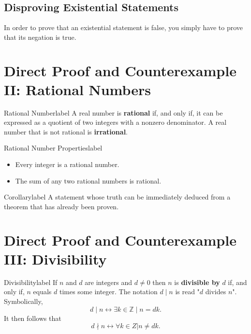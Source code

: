 \documentclass[a4paper]{report}
\begin{document}
\subsection{Disproving Existential Statements}

In order to prove that an existential statement is false, you simply have to prove that its negation
is true.

\section{Direct Proof and Counterexample II: Rational Numbers}

\begin{definition}{Rational Number}{label}
    A real number is \textbf{rational} if, and only if, it can be expressed as a quotient of
    two integers with a nonzero denominator. A real number that is not rational is \textbf{irrational}.
\end{definition}

\begin{theorem}{Rational Number Properties}{label}
    \begin{itemize}
        \item Every integer is a rational number.
        \item The sum of any two rational numbers is rational.
    \end{itemize}
\end{theorem}

\begin{definition}{Corollary}{label}
    A statement whose truth can be immediately deduced from a theorem that has already been proven.
\end{definition}

\section{Direct Proof and Counterexample III: Divisibility}

\begin{definition}{Divisibility}{label}
    If $n$ and $d$ are integers and $d \neq 0$ then $n$ is \textbf{divisible by} $d$ if, and only
    if, $n$ equals $d$ times some integer. The notation $d  \mid n$ is read "$d$ divides $n$".
    Symbolically, \[
    d  \mid n \leftrightarrow \exists k \in \mathbb{Z}  \mid n = dk
    .\] 
    It then follows that \[
    d \nmid n \leftrightarrow \forall k \in Z | n \neq dk
    .\] 
\end{definition}
\end{document}
